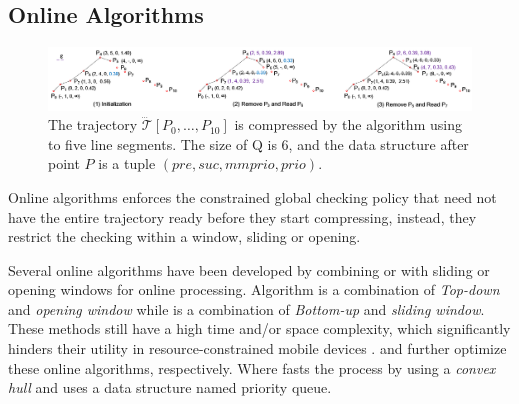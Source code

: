 \vspace{-1ex}
\subsection{Online Algorithms}

\begin{figure}[tb!]
	\centering
	\includegraphics[scale=0.55]{Figures/Fig-Squishe.png}
	\vspace{-3ex}
	\caption{\small The trajectory $\dddot{\mathcal{T}}[P_0, \ldots, P_{10}]$ is compressed by the \squishe algorithm using \sed to five line segments. The size of Q is 6, and the data structure after point $P$ is a tuple $(pre, suc, mmprio, prio)$. }
	\vspace{-3ex}
	\label{fig:squishe}
\end{figure}


Online algorithms enforces the constrained global checking policy that need not have the entire trajectory ready before they start compressing, instead, they restrict the checking within a window, sliding or opening.

Several online \lsa algorithms have been developed \eg by combining \dpa or \tpa with sliding or opening windows for online processing\cite{Meratnia:Spatiotemporal, Keogh:online}.
Algorithm \opwa \cite{Meratnia:Spatiotemporal} is a combination of \textit{Top-down} and \textit{opening window} while \cite{Keogh:online} is a combination of \textit{Bottom-up} and \textit{sliding window}.
These methods still have a high time and/or space complexity, which significantly hinders their utility in resource-constrained mobile devices \cite{Liu:BQS}.
%
\bqsa \cite{Liu:BQS} and \squishe\cite{Muckell:Compression} further optimize these online algorithms, respectively. Where \bqsa \cite{Liu:BQS} fasts the process by using a \textit{convex hull} and \squishe\cite{Muckell:Compression} uses a data structure named priority queue.


